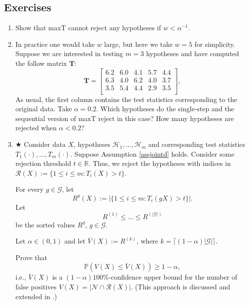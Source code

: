 \documentclass[11pt]{article}
\theoremstyle{plain}
\theoremstyle{definition}
\newcommand{\reals}{\mathbb{R}}
\newcommand{\N}{\mathcal{N}}
\newcommand{\R}{\mathcal{R}}
\newcommand{\G}{\mathcal{G}}
\newcommand{\Hy}{\mathcal{H}}
\newcommand{\pr}{\mathbb{P}}
\begin{document}
\subsection{Exercises}
\begin{enumerate}
\item  Show that maxT cannot reject any hypotheses if $w<\alpha^{-1}$.
\item 
In practice one would take $w$ large, but here we take $w=5$ for simplicity.
Suppose we are interested in testing $m=3$ hypotheses and have computed the follow matrix $\bm{T}$:
\begin{equation} 
\bm{T} =
\begin{bmatrix}
6.2 & 6.0 & 4.1 & 5.7 & 4.4 \\
6.3 & 4.0  &  6.2& 4.0 & 3.7 \\
3.5 & 5.4 & 4.4 & 2.9 & 3.5\\
\end{bmatrix}
,
\end{equation}
As usual, the first column contains the test statistics corresponding to the original data.
Take $\alpha=0.2$. Which hypotheses do the single-step and  the sequential version of maxT reject in this case? How many hypotheses are rejected when $\alpha<0.2$?


\item
$\bigstar$ Consider data $X$, hypotheses $\Hy_1,...,\Hy_m$ and corresponding test statistics $T_1(\cdot),...,T_m(\cdot)$. Suppose Assumption \ref{assjointd} holds. Consider some rejection threshold $t\in \reals$. 
Thus, we reject the hypotheses with indices in $\R(X):=\{1\leq i \leq m: T_i(X)>t\}$.

For every $g\in \G$, let 
$$ R^g(X):=|\{1\leq i \leq m: T_i(gX)>t\}|.$$
Let $$R^{(1)}\leq ...\leq R^{(|\G|)}$$ be the sorted values $R^g$, $g\in \G$.

Let $\alpha\in(0,1)$ and let 
$\bar{V}(X):= R^{(k)}$, where $k=\lceil (1-\alpha)|\G|\rceil$.

Prove that
$$\pr(V(X)\leq \bar{V}(X))\geq 1-\alpha,$$ i.e., $ \bar{V}(X)$ is a $(1-\alpha)100\%$-confidence upper bound for the number of false positives $V(X)=|\N\cap\R(X)|$. (This approach is discussed and  extended in \citealp{hemerik2018false}.) 





\end{enumerate}
\end{document}
